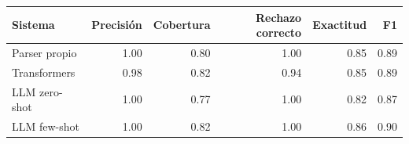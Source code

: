 \begin{tabular}{lrrrrr}
\toprule
Sistema & Precisión & Cobertura & Rechazo correcto & Exactitud & F1 \\
\midrule
Parser propio & 1.00 & 0.80 & 1.00 & 0.85 & 0.89 \\
Transformers & 0.98 & 0.82 & 0.94 & 0.85 & 0.89 \\
LLM zero-shot & 1.00 & 0.77 & 1.00 & 0.82 & 0.87 \\
LLM few-shot & 1.00 & 0.82 & 1.00 & 0.86 & 0.90 \\
\bottomrule
\end{tabular}
